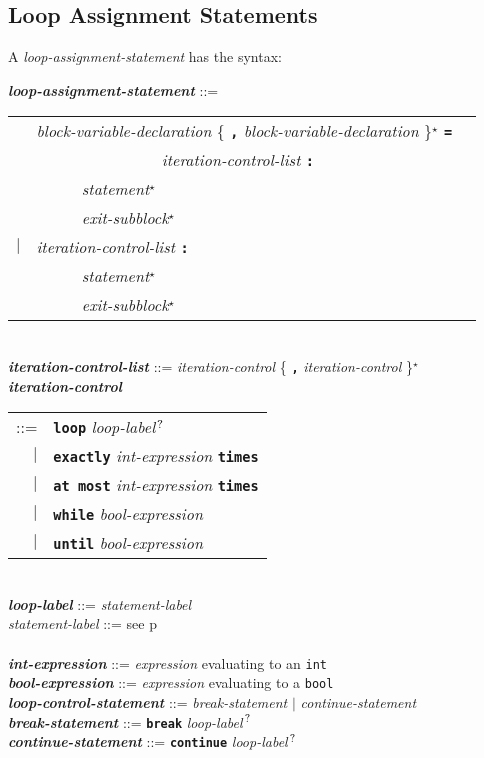\documentclass[12pt]{article}
\newcommand{\TT}[1]{{\tt \bfseries #1}}
\newcommand{\STAR}{{\Large $^\star$}}
\newcommand{\QMARK}{{$^{\,\mbox{\footnotesize ?}}$}}
\newcommand{\ttkey}[1]{{\tt \bfseries #1}}
\newcommand{\emkey}[1]{{\em \bfseries #1}}
\newcommand{\pagref}[1]{p\pageref{#1}}
\newenvironment{indpar}[1][0.3in]%
	{\begin{list}{}%
		     {\setlength{\itemsep}{0in}%
		      \setlength{\topsep}{0in}%
		      \setlength{\parsep}{1ex}%
		      \setlength{\labelwidth}{#1}%
		      \setlength{\leftmargin}{#1}%
		      \addtolength{\leftmargin}{\labelsep}}%
	 \item}%
	{\end{list}}
\begin{document}
\subsection{Loop Assignment Statements}
\label{LOOP-ASSIGNMENT-STATEMENTS}

A {\em loop-assignment-statement} has the syntax:

\begin{indpar}
\emkey{loop-assignment-statement} ::= \\
\hspace*{0.5in}
    \begin{tabular}[t]{@{}rll}
        & {\em block-variable-declaration}
                \{ \TT{,} {\em block-variable-declaration} \}\STAR{}
		\TT{=} \\
	& ~~~~~~~~~~~~~~~ {\em iteration-control-list} \TT{:} \\
        & ~~~~~ {\em statement}\STAR{} \\
        & ~~~~~ {\em exit-subblock}\STAR{} \\
    $|$ & {\em iteration-control-list} \TT{:} \\
        & ~~~~~ {\em statement}\STAR{} \\
        & ~~~~~ {\em exit-subblock}\STAR{} \\
    \end{tabular}
\\[0.5ex]
\emkey{iteration-control-list} ::=
    {\em iteration-control} \{ \TT{,} {\em iteration-control} \}\STAR{}
\\[0.5ex]
\emkey{iteration-control}\label{ITERATION-CONTROL}
    \begin{tabular}[t]{rl}
     ::= & \ttkey{loop} {\em loop-label}\QMARK{} \\
     $|$ & \ttkey{exactly} {\em int-expression} \ttkey{times} \\
     $|$ & \ttkey{at most} {\em int-expression} \ttkey{times} \\
     $|$ & \ttkey{while} {\em bool-expression} \\
     $|$ & \ttkey{until} {\em bool-expression} \\
     \end{tabular}
\\[0.5ex]
\emkey{loop-label} ::= {\em statement-label}
\\[0.5ex]
{\em statement-label} ::= see \pagref{STATEMENT-LABEL} \\
\\[0.5ex]
\emkey{int-expression} ::= {\em expression} evaluating to an {\tt int}
\\[0.5ex]
\emkey{bool-expression}\label{BOOL-EXPRESSION} ::=
    {\em expression} evaluating to a {\tt bool}
\\[0.5ex]
\emkey{loop-control-statement}\label{LOOP-CONTROL-STATEMENT} ::=
    {\em break-statement} $|$ {\em continue-statement}
\\[0.5ex]
\emkey{break-statement}\label{BREAK-STATEMENT} ::=
    \ttkey{break} {\em loop-label}\QMARK{}
\\[0.5ex]
\emkey{continue-statement}\label{CONTINUE-STATEMENT} ::=
    \ttkey{continue} {\em loop-label}\QMARK{}
\end{indpar}
\end{document}
